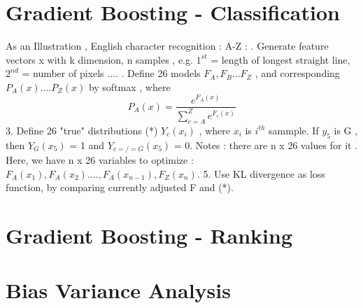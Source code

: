 \documentclass{article}
\begin{document}
\section{Gradient Boosting - Classification}
As an Illustration , English character recognition : A-Z  : . Generate feature vectors  x with k dimension, n samples , e.g. \(1^{st}\) = length of longest straight line,  \(2^{nd}\) = number of pixels .... . Define 26 models \(F_A,F_B...F_Z\) , and corresponding \(P_A(x) .... P_Z(x) \)  by softmax , where
\[ P_A(x) = \frac{e^{F_A(x)}}{\sum_{c=A}^{Z} e^{F_c(x)}}\]
3. Define 26 "true" distributions (*) \(Y_c(x_i)\) , where \(x_i\) is \(i^{th}\) sammple. If \(y_5\) is G , then  \(Y_G(x_5)\) = 1 and \(Y_{c=/=G}(x_5)\) = 0. Notes : there are n x 26 values for it . Here, we have n x 26 variables to optimize : \(F_A(x_1),F_A(x_2)....,F_A(x_{n-1}), F_Z(x_n)\). 
5. Use KL divergence as  loss function, by comparing currently adjusted F and (*).
\section{Gradient Boosting - Ranking}
\section{Bias Variance Analysis} 
\end{document}

